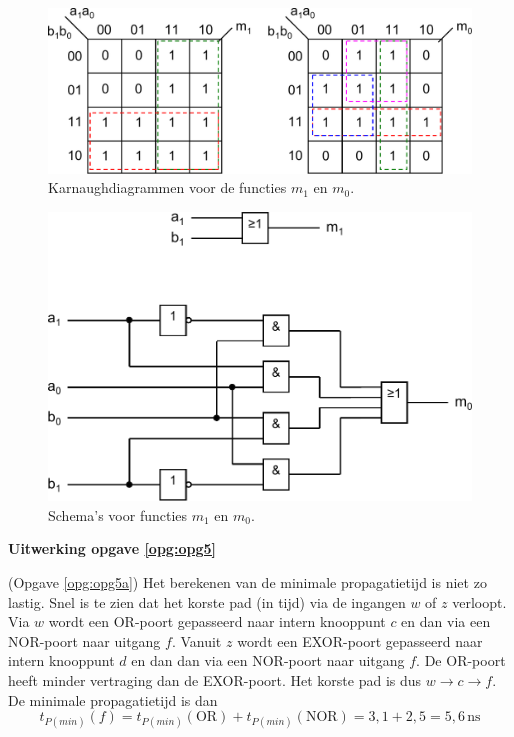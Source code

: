 \documentclass[a4paper,12pt,addpoints,fleqn,dutch]{tisdexam}
\begin{document}
\begin{questions}
\begin{figure}[H]
\begin{minipage}[c]{0.65\linewidth}
    \centering
	\includegraphics[scale=0.50]{pINLDIG2014_opgave4b_kmaps.pdf}
    \caption{Karnaughdiagrammen voor de functies $m_{1}$ en $m_{0}$.}
    \label{fig:ant_opgave4b_kmaps}
  \end{minipage}
\end{figure}

\begin{figure}[H]
  \centering
  \includegraphics[scale=0.63]{pINLDIG2014_opgave4c_schema.pdf}
  \caption{Schema's voor functies $m_{1}$ en $m_{0}$.}
  \label{fig:ant_opgave4c_schema}
\end{figure}


\newpage
\textbf{Uitwerking opgave \ref{opg:opg5}}

(Opgave \ref{opg:opg5a}) Het berekenen van de minimale propagatietijd is niet zo lastig.
Snel is te zien dat het korste pad (in tijd) via de ingangen $w$ of $z$ verloopt. Via $w$
wordt een OR-poort gepasseerd naar intern knooppunt $c$ en dan via een NOR-poort naar
uitgang $f$. Vanuit $z$ wordt een EXOR-poort gepasseerd naar intern knooppunt $d$ en
dan dan via een NOR-poort naar uitgang $f$. De OR-poort heeft minder vertraging dan de
EXOR-poort. Het korste pad is dus $w \rightarrow c \rightarrow f$. De minimale
propagatietijd is dan
\begin{equation*}
t_{P(min)}(f) = t_{P(min)}(\text{OR}) + t_{P(min)}(\text{NOR}) = 3,1 + 2,5 = 5,6 \, \textrm{ns}
\end{equation*}


\end{questions}
\end{document}
